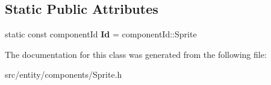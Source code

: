 \subsection*{Static Public Attributes}
\begin{DoxyCompactItemize}
\item 
\hypertarget{classSpriteComponent_acc8a12da18e2b079a0364ab7c9c64a97}{static const component\-Id {\bfseries Id} = component\-Id\-::\-Sprite}\label{classSpriteComponent_acc8a12da18e2b079a0364ab7c9c64a97}

\end{DoxyCompactItemize}


The documentation for this class was generated from the following file\-:\begin{DoxyCompactItemize}
\item 
src/entity/components/Sprite.\-h\end{DoxyCompactItemize}
